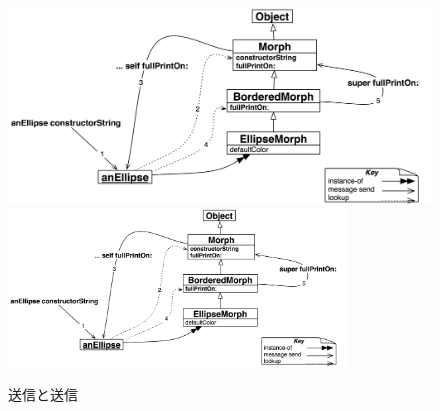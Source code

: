 \documentclass[a4paper,10pt,twoside]{book}
\begin{document}
\begin{figure}[htb]
\begin{center}
\ifluluelse
	{\includegraphics[width=\textwidth]{constructorStringLookup}}
	{\includegraphics[width=0.8\textwidth]{constructorStringLookup}}
\caption{\self 送信と\super 送信}
\end{center}
\end{figure}
\end{document}
